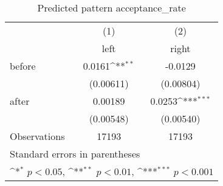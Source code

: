 \begin{table}[htbp]\centering
\def\sym#1{\ifmmode^{#1}\else\(^{#1}\)\fi}
\caption{Predicted pattern acceptance\_rate}
\begin{tabular}{l*{2}{c}}
\hline\hline
                    &\multicolumn{1}{c}{(1)}&\multicolumn{1}{c}{(2)}\\
                    &\multicolumn{1}{c}{left}&\multicolumn{1}{c}{right}\\
\hline
before              &      0.0161\sym{**} &     -0.0129         \\
                    &   (0.00611)         &   (0.00804)         \\
[1em]
after               &     0.00189         &      0.0253\sym{***}\\
                    &   (0.00548)         &   (0.00540)         \\
\hline
Observations        &       17193         &       17193         \\
\hline\hline
\multicolumn{3}{l}{\footnotesize Standard errors in parentheses}\\
\multicolumn{3}{l}{\footnotesize \sym{*} \(p<0.05\), \sym{**} \(p<0.01\), \sym{***} \(p<0.001\)}\\
\end{tabular}
\end{table}
